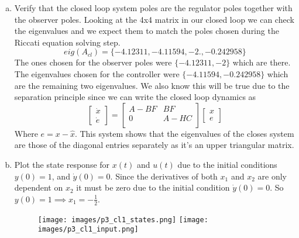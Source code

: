 \documentclass{article}
\begin{document}
\begin{enumerate}[(a)]
\item Verify that the closed loop system poles are the regulator poles together with the observer poles.
\newline
Looking at the 4x4 matrix in our closed loop we can check the eigenvalues and we expect them to match the poles chosen during the Riccati equation solving step.
$$ eig(A_{cl})= \{-4.12311, -4.11594, -2., -0.242958\} $$
The ones chosen for the observer poles were $\{ -4.12311, -2\}$ which are there.
The eigenvalues chosen for the controller were $\{-4.11594,-0.242958\}$ which are the remaining two eigenvalues.
We also know this will be true due to the separation principle since we can write the closed loop dynamics as
$$
\begin{bmatrix} \dot{x} \\ \dot{e} \end{bmatrix} =
\begin{bmatrix}
A - BF & BF \\
0 & A - HC \\
\end{bmatrix}
\begin{bmatrix} x \\ e \end{bmatrix}
$$
Where $e = x -\hat{x}$. This system shows that the eigenvalues of the closes system are those of the diagonal entries separately as it's an upper triangular matrix.

\newpage
\item Plot the state response for $x(t)$ and $u(t)$ due to the initial conditions $y(0)=1$, and $\dot{y}(0)=0$.
\newline
Since the derivatives of both $x_1$ and $x_2$ are only dependent on $x_2$ it must be zero due to the initial condition $\dot{y}(0)=0$.
So $y(0)=1 \implies x_1 = -\frac{1}{2}$.
\begin{figure}[!htb]
\centering
\texttt{[image: images/p3\_cl1\_states.png]}
\texttt{[image: images/p3\_cl1\_input.png]}
\end{figure}


\end{enumerate}
\end{document}

